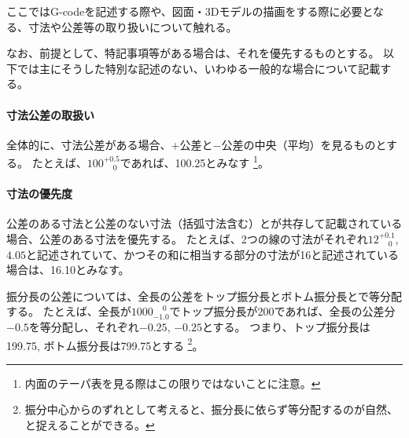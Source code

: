 
ここではG-codeを記述する際や、図面・3Dモデルの描画をする際に必要となる、寸法や公差等の取り扱いについて触れる。

なお、前提として、特記事項等がある場合は、それを優先するものとする。
以下では主にそうした特別な記述のない、いわゆる一般的な場合について記載する。




\paragraph*{寸法公差の取扱い}\noindent
全体的に、寸法公差がある場合、$+$公差と$-$公差の中央（平均）を見るものとする。
たとえば、$100^{+0.5}_{\phantom -0}$であれば、100.25とみなす
\footnote{内面のテーパ表を見る際はこの限りではないことに注意。}。

\paragraph*{寸法の優先度}\noindent
公差のある寸法と公差のない寸法（括弧寸法含む）とが共存して記載されている場合、公差のある寸法を優先する。
たとえば、2つの線の寸法がそれぞれ$12^{+0.1}_{\phantom -0}$, $4.05$と記述されていて、かつその和に相当する部分の寸法が16と記述されている場合は、16.10とみなす。




振分長の公差については、全長の公差をトップ振分長とボトム振分長とで等分配する。
たとえば、全長が$1000^{\phantom +0}_{-1.0}$でトップ振分長が200であれば、全長の公差分$-0.5$を等分配し、それぞれ$-0.25$, $-0.25$とする。
つまり、トップ振分長は199.75, ボトム振分長は799.75とする
\footnote{振分中心からのずれとして考えると、振分長に依らず等分配するのが自然、と捉えることができる。}。

